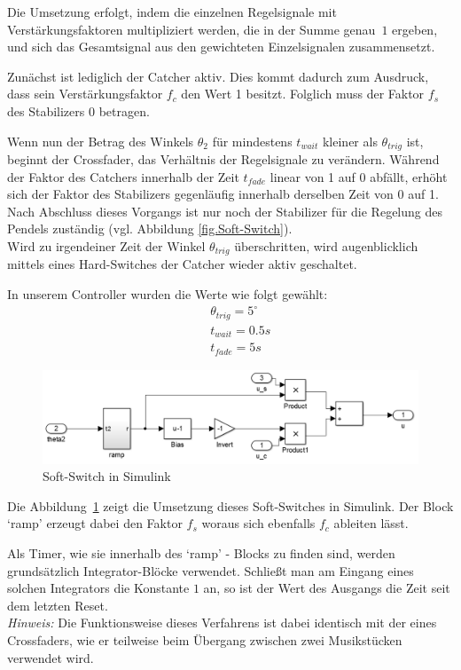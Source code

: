 Die Umsetzung erfolgt, indem die einzelnen Regelsignale mit Verstärkungs\-fak\-to\-ren multipliziert werden, die in der Summe genau~$1$ ergeben, und sich das Gesamtsignal aus den gewichteten Einzelsignalen zusammensetzt.

Zunächst ist lediglich der Catcher aktiv. Dies kommt dadurch zum Ausdruck, dass sein Verstärkungsfaktor $f_c$ den Wert 1 besitzt. Folglich muss der Faktor $f_s$ des Stabilizers 0 betragen.

Wenn nun der Betrag des Winkels $\theta_2$ für mindestens $t_{wait}$ kleiner als $\theta_{trig}$ ist, beginnt der Crossfader, das Verhältnis der Regelsignale zu verändern.
Während der Faktor des Catchers innerhalb der Zeit $t_{fade}$ linear von 1 auf 0 abfällt, erhöht sich der Faktor des Stabilizers gegenläufig innerhalb derselben Zeit von 0 auf 1.
Nach Abschluss dieses Vorgangs ist nur noch der Stabilizer für die Regelung des Pendels zuständig (vgl. Abbildung \ref{fig.Soft-Switch}). \\

Wird zu irgendeiner Zeit der Winkel $\theta_{trig}$ überschritten, wird augenblicklich mittels eines Hard-Switches der Catcher wieder aktiv geschaltet.

In unserem Controller wurden die Werte wie folgt gewählt:
\begin{eqnarray*}
&& \theta_{trig} = 5^{\circ} \\
&& t_{wait} = 0.5 s \\
&& t_{fade} = 5 s
\end{eqnarray*}

\begin{figure}[htbp]
	\centering	
	\includegraphics[width=1\textwidth]{Grafiken/simulink_softswitch.png}
	\caption{Soft-Switch in Simulink}
	\label{fig.Simu_Soft-Switch}
\end{figure}

Die Abbildung~\ref{fig.Simu_Soft-Switch} zeigt die Umsetzung dieses Soft-Switches in Simulink. Der Block `ramp' erzeugt dabei den Faktor $f_s$ woraus sich ebenfalls $f_c$ ableiten lässt.

Als Timer, wie sie innerhalb des `ramp' - Blocks zu finden sind, werden grund\-sätz\-lich Integrator-Blöcke verwendet. Schließt man am Eingang eines solchen Integrators die Konstante $1$ an, so ist der Wert des Ausgangs die Zeit seit dem letzten Reset.\\

\textit{Hinweis:} Die Funktionsweise dieses Verfahrens ist dabei identisch mit der eines Crossfaders, wie er teilweise beim Übergang zwischen zwei Musikstücken verwendet wird.

